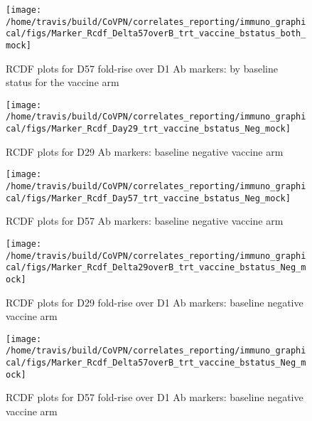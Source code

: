 \documentclass[]{book}
\theoremstyle{definition}
\theoremstyle{definition}
\theoremstyle{definition}
\newcommand{\1}{\mathbbm{1}}
\begin{document}
\clearpage
\begin{figure}[H]

{\centering \texttt{[image: /home/travis/build/CoVPN/correlates\_reporting/immuno\_graphical/figs/Marker\_Rcdf\_Delta57overB\_trt\_vaccine\_bstatus\_both\_mock]} 

}

\caption{RCDF plots for D57 fold-rise over D1 Ab markers: by baseline status for the vaccine arm}\label{fig:unnamed-chunk-28}
\end{figure}

\clearpage
\begin{figure}[H]

{\centering \texttt{[image: /home/travis/build/CoVPN/correlates\_reporting/immuno\_graphical/figs/Marker\_Rcdf\_Day29\_trt\_vaccine\_bstatus\_Neg\_mock]} 

}

\caption{RCDF plots for D29 Ab markers: baseline negative vaccine arm}\label{fig:unnamed-chunk-29}
\end{figure}

\clearpage
\begin{figure}[H]

{\centering \texttt{[image: /home/travis/build/CoVPN/correlates\_reporting/immuno\_graphical/figs/Marker\_Rcdf\_Day57\_trt\_vaccine\_bstatus\_Neg\_mock]} 

}

\caption{RCDF plots for D57 Ab markers: baseline negative vaccine arm}\label{fig:unnamed-chunk-30}
\end{figure}

\clearpage
\begin{figure}[H]

{\centering \texttt{[image: /home/travis/build/CoVPN/correlates\_reporting/immuno\_graphical/figs/Marker\_Rcdf\_Delta29overB\_trt\_vaccine\_bstatus\_Neg\_mock]} 

}

\caption{RCDF plots for D29 fold-rise over D1 Ab markers: baseline negative vaccine arm}\label{fig:unnamed-chunk-31}
\end{figure}

\clearpage
\begin{figure}[H]

{\centering \texttt{[image: /home/travis/build/CoVPN/correlates\_reporting/immuno\_graphical/figs/Marker\_Rcdf\_Delta57overB\_trt\_vaccine\_bstatus\_Neg\_mock]} 

}

\caption{RCDF plots for D57 fold-rise over D1 Ab markers: baseline negative vaccine arm}\label{fig:unnamed-chunk-32}
\end{figure}
\end{document}
